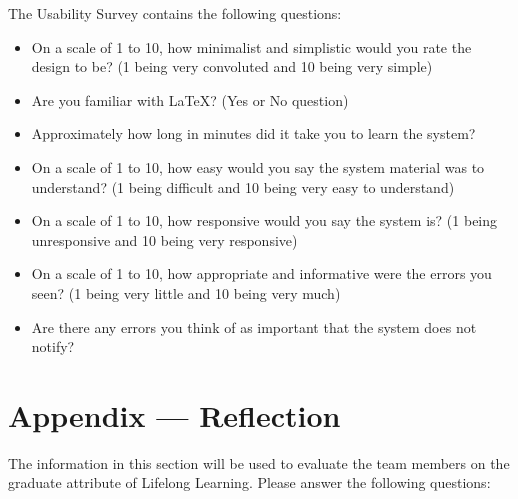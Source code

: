 \documentclass[12pt, titlepage]{article}
\begin{document}
	The Usability Survey contains the following questions:
	\begin{itemize}
		\item On a scale of 1 to 10, how minimalist and simplistic would you rate the design to be? (1 being very convoluted and 10 being very simple)
		\item Are you familiar with LaTeX? (Yes or No question)
		\item Approximately how long in minutes did it take you to learn the system?
		\item On a scale of 1 to 10, how easy would you say the system material was to understand? (1 being difficult and 10 being very easy to understand)
		\item On a scale of 1 to 10, how responsive would you say the system is? (1 being unresponsive and 10 being very responsive)
		\item On a scale of 1 to 10, how appropriate and informative were the errors you seen? (1 being very little and 10 being very much)
		\item Are there any errors you think of as important that the system does not notify?
	\end{itemize}
	
	
	
	\newpage{}
	\section*{Appendix --- Reflection}
	
	The information in this section will be used to evaluate the team members on the
	graduate attribute of Lifelong Learning.  Please answer the following questions:
	
\end{document}
